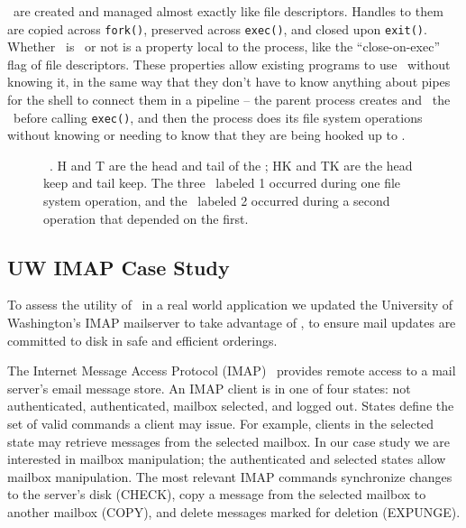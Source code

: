 \Opgroups\ are created and managed almost exactly like file descriptors. Handles
to them are copied across \texttt{fork()}, preserved across \texttt{exec()}, and
closed upon \texttt{exit()}. Whether \anopgroup\ is \engaged\ or not is a
property local to the process, like the ``close-on-exec'' flag of file
descriptors. These properties allow existing programs to use \opgroups\ without
knowing it, in the same way that they don't have to know anything about pipes
for the shell to connect them in a pipeline -- the parent process creates and
\engages\ the \opgroups\ before calling \texttt{exec()}, and then the process
does its file system operations without knowing or needing to know that they are
being hooked up to \anopgroup.

\begin{figure}[htb]
\caption{\label{fig:opgroup-chdescs} \Opgroup\ \ChDescs. H and T are the head
and tail of the \opgroup; HK and TK are the head keep and tail keep. The three
\chdescs\ labeled 1 occurred during one file system operation, and the \chdesc\
labeled 2 occurred during a second operation that depended on the first.}
\end{figure}

\subsection{UW IMAP Case Study}
\label{sec:opgroup:uwimap}

To assess the utility of \opgroups\ in a real world application we
updated the University of Washington's IMAP mailserver to take
advantage of \opgroups, to ensure mail updates are committed to disk
in safe and efficient orderings.

The Internet Message Access Protocol (IMAP)~\cite{rfc3501} provides
remote access to a mail server's email message store. An IMAP client
is in one of four states: not authenticated, authenticated, mailbox
selected, and logged out. States define the set of valid commands a
client may issue. For example, clients in the selected state may
retrieve messages from the selected mailbox. In our case study we are
interested in mailbox manipulation; the authenticated and selected
states allow mailbox manipulation. The most relevant IMAP commands
synchronize changes to the server's disk (CHECK), copy a message from
the selected mailbox to another mailbox (COPY), and delete messages
marked for deletion (EXPUNGE).

